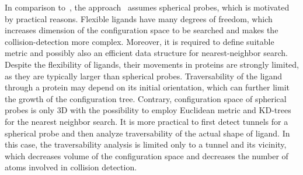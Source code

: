 \documentclass{llncs}
\begin{document}
In comparison to~\cite{guieysse2008structure}, the approach~\cite{vonasek2016application} assumes spherical probes, which is motivated
by practical reasons.
Flexible ligands have many degrees of freedom, which increases dimension of the configuration space to be searched and makes
the collision-detection more complex.
Moreover, it is required to define suitable metric and possibly also an efficient data structure for nearest-neighbor search.
Despite the flexibility of ligands, their movements in proteins are strongly limited, as they are typically larger than spherical
probes.
Traversability of the ligand through a protein may depend on its initial orientation, 
 which can further limit the growth of the configuration tree.
Contrary, configuration space of  spherical probes is only 3D with the possibility to employ Euclidean metric and KD-trees for the
nearest neighbor search.
It is more practical to first detect tunnels for a spherical probe and then analyze traversability of the actual shape of ligand.
In this case, the traversability analysis is limited only to a tunnel and its vicinity, which decreases volume of the configuration space and
decreases the number of atoms involved in collision detection.
\end{document}
